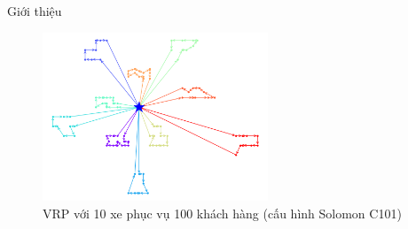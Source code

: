 
\begin{frame}{Giới thiệu}
    \begin{figure}[H] %
        \centering %
        \includegraphics[width=0.6\textwidth]{figures/routes_c101.png} 
        \caption{VRP với 10 xe phục vụ 100 khách hàng (cấu hình Solomon C101)} 
    \end{figure}
\end{frame}